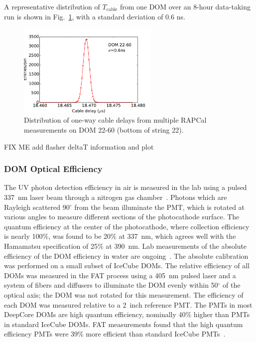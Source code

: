 \noindent A representative distribution of $T_{\mathrm{cable}}$ from one DOM over an 8-hour
data-taking run is shown in Fig.~\ref{fig:rapcal_cable_len}, with a
standard deviation of 0.6 ns.


\begin{figure}[!h]
 \centering
 \includegraphics[width=0.6\textwidth]{graphics/dom/rapcal/tcal_hist_22-60.pdf}
 \caption{Distribution of one-way cable delays from multiple RAPCal
   measurements on DOM 22-60 (bottom of string 22).}
 \label{fig:rapcal_cable_len}
\end{figure}

FIX ME add flasher deltaT information and plot

\subsubsection{\label{sec:domeff} DOM Optical Efficiency}

The UV photon detection efficiency in air is measured in the lab using a
pulsed 337~nm laser beam through a nitrogen gas chamber~\cite{ICECUBE:PMT}. Photons
which are Rayleigh scattered 90$^{\circ}$ from the beam illuminate the PMT,
which is rotated at various angles to measure different sections of
the photocathode surface. The quantum efficiency at the center of the
photocathode, where collection efficiency is nearly 100\%, was found
to be 20\% at 337~nm, which agrees well with the Hamamatsu
specification of 25\% at 390~nm. Lab measurements of the absolute efficiency of the DOM efficiency in water are ongoing~\cite{ICECUBE:DOMEFF}. The absolute calibration was performed on a small subset of IceCube DOMs. The relative efficiency of all DOMs was measured in the FAT process using a 405~nm pulsed laser and a system of fibers and diffusers to illuminate the DOM evenly within 50$^{\circ}$ of the optical axis; the DOM was not rotated for this measurement. The efficiency of each DOM was measured relative to a 2~inch reference PMT. The PMTs in most DeepCore DOMs are high quantum efficiency, nominally 40\% higher than PMTs in standard IceCube DOMs. FAT measurements found that the high quantum efficiency PMTs were 39\% more efficient than standard IceCube PMTs~\cite{ICECUBE:DC}.

